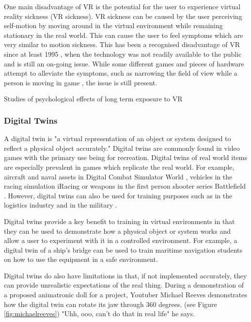 \documentclass[12pt]{article}
\begin{document}
One main disadvantage of VR is the potential for the user to experience virtual reality sickness (VR sickness). VR sickness can be caused by the user perceiving self-motion by moving around in the virtual environment while remaining stationary in the real world. This can cause the user to feel symptoms which are very similar to motion sickness. \cite{chang2020virtual} This has been a recognised disadvantage of VR since at least 1995 \cite{regan1995investigation}, when the technology was not readily available to the public and is still an on-going issue. While some different games and pieces of hardware attempt to alleviate the symptoms, such as narrowing the field of view while a person is moving in game \cite{RecRoomVRMovement}\cite{fernandes2016combating}, the issue is still present.

Studies of psychological effects of long term exposure to VR

\subsubsection{Digital Twins}

A digital twin is "a virtual representation of an object or system designed to reflect a physical object accurately." \cite{ibmDigitalTwin} Digital twins are commonly found in video games with the primary use being for recreation. Digital twins of real world items are especially prevalent in games which replicate the real world. For example, aircraft and naval assets in Digital Combat Simulator World \cite{dcsworld}, vehicles in the racing simulation iRacing \cite{iracing} or weapons in the first person shooter series Battlefield \cite{battlefield4}. However, digital twins can also be used for training purposes such as in the logistics industry \cite{longo2023prepare} and in the military \cite{ukcatt}.

Digital twins provide a key benefit to training in virtual environments in that they can be used to demonstrate how a physical object or system works and allow a user to experiment with it in a controlled environment. For example, a digital twin of a ship's bridge can be used to train maritime navigation students on how to use the equipment in a safe environment. 

Digital twins do also have limitations in that, if not implemented accurately, they can provide unrealistic expectations of the real thing. During a demonstration of a proposed animatronic doll for a project, Youtuber Michael Reeves demonstrates how the digital twin can rotate its jaw through 360 degrees. (see Figure \ref{fig:michaelreeves}) "Uhh, ooo, can't do that in real life" he says. \cite{reevesYouTube}
\end{document}
